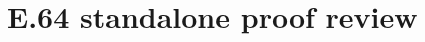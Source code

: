 \documentclass[11pt,a4paper]{article}
\begin{document}
\section*{E.64 standalone proof review}



\end{document}
